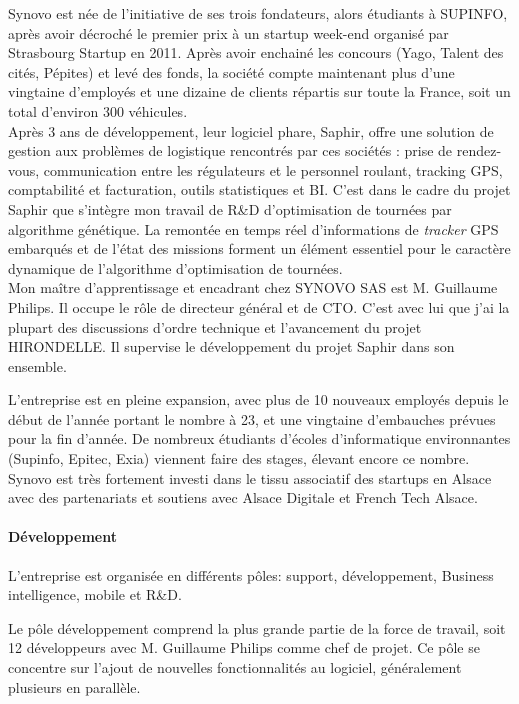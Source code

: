 \documentclass[12pt]{memoir}
\begin{document}
\bigskip
Synovo est née de l'initiative de ses trois fondateurs, alors étudiants
à SUPINFO, après avoir décroché le premier prix à un startup week-end
organisé par Strasbourg Startup en 2011. Après avoir enchainé les
concours (Yago, Talent des cités, Pépites) et levé des fonds, la société
compte maintenant plus d'une vingtaine d'employés et une dizaine de
clients répartis sur toute la France, soit un total d'environ 300
véhicules. \\
Après 3 ans de développement, leur logiciel phare, Saphir, offre une
solution de gestion aux problèmes de logistique rencontrés par ces
sociétés : prise de rendez-vous, communication entre les régulateurs et
le personnel roulant, tracking GPS, comptabilité et facturation, outils
statistiques et BI. C'est dans le cadre du projet Saphir que s'intègre mon
travail de R\&D d'optimisation de tournées par algorithme génétique. La
remontée en temps réel d'informations de \emph{tracker} GPS embarqués et
de l'état des missions forment un élément essentiel pour le caractère
dynamique de l'algorithme d'optimisation de tournées. \\
Mon maître
d'apprentissage et encadrant chez SYNOVO SAS est M. Guillaume Philips.
Il occupe le rôle de directeur général et de CTO. C'est avec lui que
j'ai la plupart des discussions d'ordre technique et l'avancement du
projet HIRONDELLE. Il supervise le développement du projet Saphir dans
son ensemble.

\bigskip
L'entreprise est en pleine expansion, avec plus de 10 nouveaux employés
depuis le début de l'année portant le nombre à 23, et une vingtaine
d'embauches prévues pour la fin d'année. De nombreux étudiants d'écoles
d'informatique environnantes (Supinfo, Epitec, Exia) viennent faire des
stages, élevant encore ce nombre. Synovo est très fortement investi dans
le tissu associatif des startups en Alsace avec des partenariats et
soutiens avec Alsace Digitale et French Tech Alsace.

\paragraph{Développement}\label{duxe9veloppement}

L'entreprise est organisée en différents pôles: support, développement,
Business intelligence, mobile et R\&D.

Le pôle développement comprend la plus grande partie de la force de
travail, soit 12 développeurs avec M. Guillaume Philips comme chef de
projet. Ce pôle se concentre sur l'ajout de nouvelles fonctionnalités au
logiciel, généralement plusieurs en parallèle.
\end{document}
